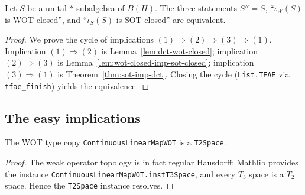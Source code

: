 \begin{theorem}
    \label{thm:dct}
    \leanok
    Let $S$ be a unital $*$-subalgebra of $B(H)$. The three statements
    $S'' = S$, ``$\iota_W(S)$ is WOT-closed'', and ``$\iota_S(S)$ is SOT-closed''
    are equivalent.
\end{theorem}
\begin{proof}
    We prove the cycle of implications
    $(1) \Rightarrow (2) \Rightarrow (3) \Rightarrow (1)$.
    Implication $(1) \Rightarrow (2)$ is
    Lemma~\ref{lem:dct-wot-closed}; implication $(2) \Rightarrow (3)$ is
    Lemma~\ref{lem:wot-closed-imp-sot-closed}; implication
    $(3) \Rightarrow (1)$ is Theorem~\ref{thm:sot-imp-dct}. Closing the cycle
    (\texttt{List.TFAE} via \texttt{tfae\_finish}) yields the equivalence.
\end{proof}

\subsection{The easy implications}

\begin{lemma}
    \label{lem:wot-t2space}
    \leanok
    The WOT type copy \texttt{ContinuousLinearMapWOT} is a \texttt{T2Space}.
\end{lemma}
\begin{proof}
    The weak operator topology is in fact regular Hausdorff: Mathlib provides the
    instance \texttt{ContinuousLinearMapWOT.instT3Space}, and every $T_3$ space is
    a $T_2$ space. Hence the \texttt{T2Space} instance resolves.
\end{proof}

